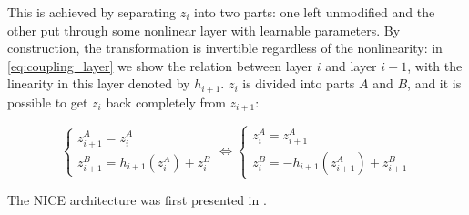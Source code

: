 \documentclass[../main.tex]{subfiles}
\begin{document}
This is achieved by separating $z_i$ into two parts: one left unmodified and the other put through some nonlinear layer with learnable parameters.
By construction, the transformation is invertible regardless of the nonlinearity: in \autoref{eq:coupling_layer} we show the relation between layer $i$ and layer $i+1$, with the linearity in this layer denoted by $h_{i+1}$. $z_i$ is divided into parts $A$ and $B$, and it is possible to get $z_i$ back completely from $z_{i+1}$:

\begin{equation}
    \label{eq:coupling_layer}
    \begin{cases}
        z_{i+1}^A = z_i^A \\
        z_{i+1}^B = h_{i+1}(z_i^A) + z_i^B
    \end{cases}
    \Leftrightarrow
    \begin{cases}
        z_i^A = z_{i+1}^A \\
        z_i^B = -h_{i+1}(z_{i+1}^A) + z_{i+1}^B
    \end{cases}
\end{equation}

The NICE architecture was first presented in \cite{dinhNICE2015}.
\end{document}
